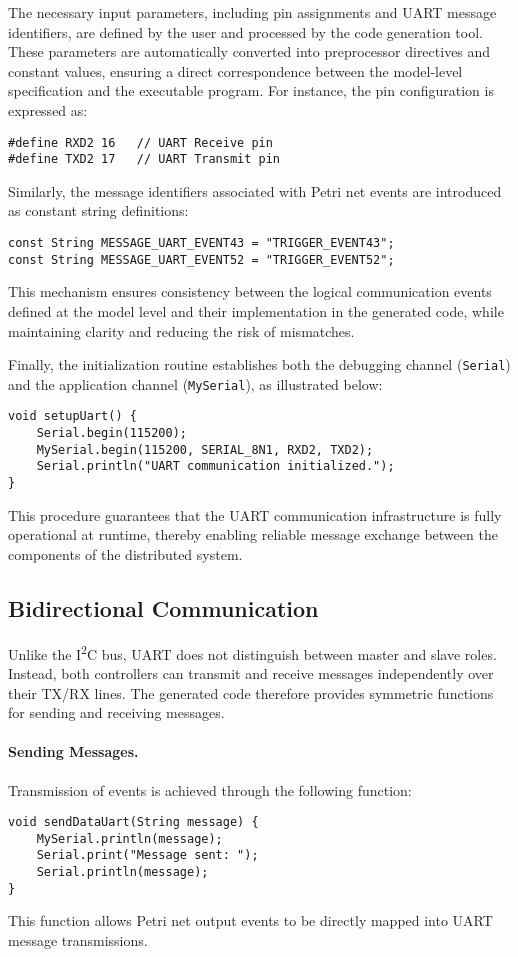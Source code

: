 The necessary input parameters, including pin assignments and UART message identifiers, are defined by the user and processed by the code generation tool. These parameters are automatically converted into preprocessor directives and constant values, ensuring a direct correspondence between the model-level specification and the executable program. For instance, the pin configuration is expressed as:
\begin{verbatim}
#define RXD2 16   // UART Receive pin
#define TXD2 17   // UART Transmit pin
\end{verbatim}

Similarly, the message identifiers associated with Petri net events are introduced as constant string definitions:
\begin{verbatim}
const String MESSAGE_UART_EVENT43 = "TRIGGER_EVENT43";
const String MESSAGE_UART_EVENT52 = "TRIGGER_EVENT52";
\end{verbatim}
This mechanism ensures consistency between the logical communication events defined at the model level and their implementation in the generated code, while maintaining clarity and reducing the risk of mismatches.

Finally, the initialization routine establishes both the debugging channel (\texttt{Serial}) and the application channel (\texttt{MySerial}), as illustrated below:
\begin{verbatim}
void setupUart() {
    Serial.begin(115200);
    MySerial.begin(115200, SERIAL_8N1, RXD2, TXD2);
    Serial.println("UART communication initialized.");
}
\end{verbatim}
This procedure guarantees that the UART communication infrastructure is fully operational at runtime, thereby enabling reliable message exchange between the components of the distributed system.



\subsection{Bidirectional Communication}
Unlike the I\textsuperscript{2}C bus, UART does not distinguish between master and slave roles. Instead, both controllers can transmit and receive messages independently over their TX/RX lines. The generated code therefore provides symmetric functions for sending and receiving messages.

\paragraph{Sending Messages.}  
Transmission of events is achieved through the following function:
\begin{verbatim}
void sendDataUart(String message) {
    MySerial.println(message);
    Serial.print("Message sent: ");
    Serial.println(message);
}
\end{verbatim}
This function allows Petri net output events to be directly mapped into UART message transmissions.

